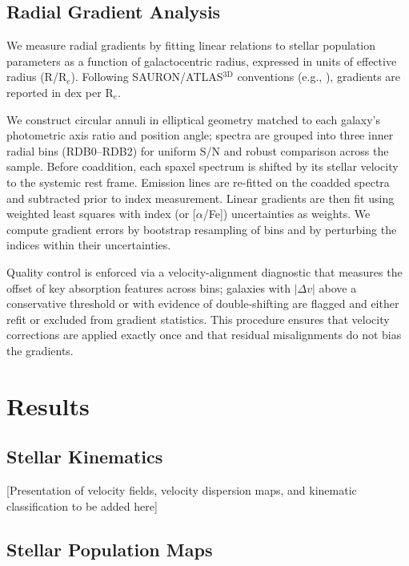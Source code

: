 \documentclass[linenumbers,trackchanges,twocolumn]{aastex631}
\begin{document}
\subsection{Radial Gradient Analysis}

We measure radial gradients by fitting linear relations to stellar population parameters as a function of galactocentric radius, expressed in units of effective radius (R/R$_e$). Following SAURON/ATLAS$^{3\mathrm{D}}$ conventions (e.g., \citealt{McDermid_2015}), gradients are reported in dex per R$_e$.

We construct circular annuli in elliptical geometry matched to each galaxy's photometric axis ratio and position angle; spectra are grouped into three inner radial bins (RDB0--RDB2) for uniform S/N and robust comparison across the sample. Before coaddition, each spaxel spectrum is shifted by its stellar velocity to the systemic rest frame. Emission lines are re-fitted on the coadded spectra and subtracted prior to index measurement. Linear gradients are then fit using weighted least squares with index (or [$\alpha$/Fe]) uncertainties as weights. We compute gradient errors by bootstrap resampling of bins and by perturbing the indices within their uncertainties.

Quality control is enforced via a velocity-alignment diagnostic that measures the offset of key absorption features across bins; galaxies with $|\Delta v|$ above a conservative threshold or with evidence of double-shifting are flagged and either refit or excluded from gradient statistics. This procedure ensures that velocity corrections are applied exactly once and that residual misalignments do not bias the gradients.

\section{Results}

\subsection{Stellar Kinematics}

[Presentation of velocity fields, velocity dispersion maps, and kinematic classification to be added here]

\subsection{Stellar Population Maps}
\end{document}
